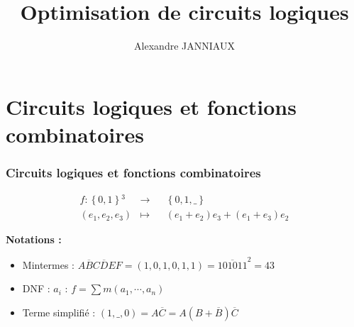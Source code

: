 \documentclass[handout]{beamer}
\title{Optimisation de circuits logiques}
\author{Alexandre JANNIAUX}
\date{}
\newcommand{\lnon}{\overline}
\newcommand{\ensemble}[1]{\left\lbrace{} #1 \right\rbrace{}}
\begin{document}
\begin{frame}
  \maketitle
  \tableofcontents
\end{frame}

\section{Circuits logiques et fonctions combinatoires}
\begin{frame}
  \frametitle{Circuits logiques et fonctions combinatoires}
  
  \[ \begin{aligned}
    f: \ensemble{0,1}^3 &\longrightarrow && \ensemble{0,1,\_} \\
    (e_1,e_2,e_3) & \longmapsto && (e_1+e_2)e_3 + (e_1+e_3)e_2
  \end{aligned}
  \]

  \textbf{Notations : }
  \begin{itemize}
  \item Mintermes : $A\lnon{B}C\lnon{D}EF = (1,0,1,0,1,1) = \overline{101011}^{2} = 43$
  \item DNF : $a_i$ : $f = \sum m(a_1, \cdots, a_n)$
  \item Terme simplifié : $(1,\_,0) = A\overline{C} = A(B+\overline{B})\overline{C}$
  \end{itemize}
  

\end{frame}
\end{document}
